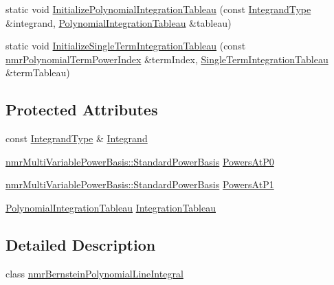 \begin{DoxyCompactItemize}
\item 
static void \hyperlink{classnmr_bernstein_polynomial_line_integral_a8e151090a2dd8cb6e6ec5f9f3595bfa7}{Initialize\+Polynomial\+Integration\+Tableau} (const \hyperlink{classnmr_bernstein_polynomial_line_integral_a5c7945eacbf7d3d225de9d11bbac138c}{Integrand\+Type} \&integrand, \hyperlink{classnmr_bernstein_polynomial_line_integral_a60deb00991c5e0971d60280bcbb7a405}{Polynomial\+Integration\+Tableau} \&tableau)
\item 
static void \hyperlink{classnmr_bernstein_polynomial_line_integral_a6ff825644582e0e351f559f27fd0c36f}{Initialize\+Single\+Term\+Integration\+Tableau} (const \hyperlink{classnmr_polynomial_term_power_index}{nmr\+Polynomial\+Term\+Power\+Index} \&term\+Index, \hyperlink{classnmr_bernstein_polynomial_line_integral_a1d31908eb8195d1c00427f12dee7fe6b}{Single\+Term\+Integration\+Tableau} \&term\+Tableau)
\end{DoxyCompactItemize}
\subsection*{Protected Attributes}
\begin{DoxyCompactItemize}
\item 
const \hyperlink{classnmr_bernstein_polynomial_line_integral_a5c7945eacbf7d3d225de9d11bbac138c}{Integrand\+Type} \& \hyperlink{classnmr_bernstein_polynomial_line_integral_adbc106d66e19ba746e42de7fda86782c}{Integrand}
\item 
\hyperlink{classnmr_multi_variable_power_basis_a7aea4d2b9847560899648720ee61b988}{nmr\+Multi\+Variable\+Power\+Basis\+::\+Standard\+Power\+Basis} \hyperlink{classnmr_bernstein_polynomial_line_integral_a2afceb5c30ca047d1e04fd5133843f63}{Powers\+At\+P0}
\item 
\hyperlink{classnmr_multi_variable_power_basis_a7aea4d2b9847560899648720ee61b988}{nmr\+Multi\+Variable\+Power\+Basis\+::\+Standard\+Power\+Basis} \hyperlink{classnmr_bernstein_polynomial_line_integral_aa7a7f9670060b02df2585e72b9895162}{Powers\+At\+P1}
\item 
\hyperlink{classnmr_bernstein_polynomial_line_integral_a60deb00991c5e0971d60280bcbb7a405}{Polynomial\+Integration\+Tableau} \hyperlink{classnmr_bernstein_polynomial_line_integral_a456c109c5eae6cf3194a6e5aae8a6ec0}{Integration\+Tableau}
\end{DoxyCompactItemize}


\subsection{Detailed Description}
class \hyperlink{classnmr_bernstein_polynomial_line_integral}{nmr\+Bernstein\+Polynomial\+Line\+Integral}

